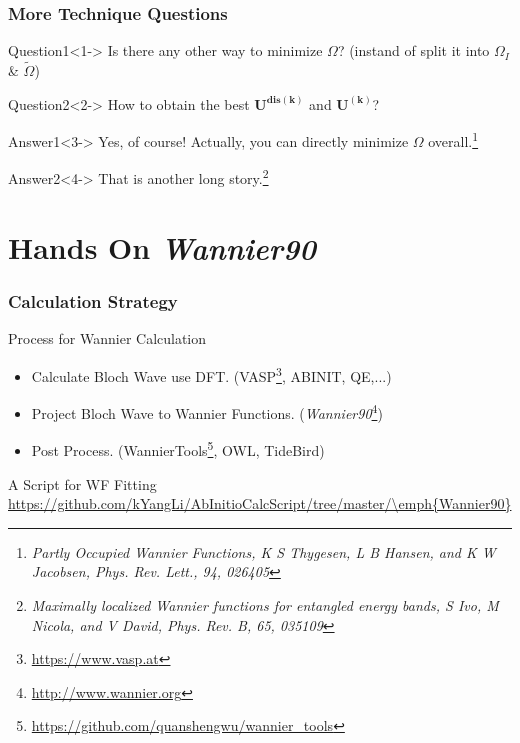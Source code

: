 \documentclass{beamer}
\begin{document}
  \begin{frame}
    \frametitle{More Technique Questions}
    \begin{alertblock}{Question1}<1->
      Is there any other way to minimize \(\Omega\)? (instand of split it into \(\Omega_I\) \& \(\widetilde{\Omega}\))
    \end{alertblock}


    \begin{alertblock}{Question2}<2->
      How to obtain the best \(\mathbf{U^{dis(\mathbf{k})}}\) and \(\mathbf{U^{(\mathbf{k})}}\)?
    \end{alertblock}

    \begin{block}{Answer1}<3->
      Yes, of course! Actually, you can directly minimize \(\Omega\) overall.\footnote{\tiny\emph{Partly Occupied Wannier Functions, K S Thygesen, L B Hansen, and K W Jacobsen, Phys. Rev. Lett., 94, 026405}}
    \end{block}

    \begin{block}{Answer2}<4->
      That is another long story.\footnote{\tiny\emph{Maximally localized Wannier functions for entangled energy bands, S Ivo, M Nicola, and V David, Phys. Rev. B, 65, 035109}}
    \end{block}

  \end{frame}

  \section{Hands On \emph{Wannier90}}
  
  \begin{frame}
    \frametitle{Calculation Strategy}
    \begin{block}{Process for Wannier Calculation}
      \begin{itemize}
        \item Calculate Bloch Wave use DFT. (VASP\footnote{\url{https://www.vasp.at}}, ABINIT, QE,...)
        \item Project Bloch Wave to Wannier Functions. (\emph{Wannier90}\footnote{\url{http://www.wannier.org}})
        \item Post Process. (WannierTools\footnote{\url{https://github.com/quanshengwu/wannier_tools}}, OWL, TideBird)
      \end{itemize}      
    \end{block}

    \begin{block}{A Script for WF Fitting}
      \url{https://github.com/kYangLi/AbInitioCalcScript/tree/master/\emph{Wannier90}}
    \end{block}

  \end{frame}
\end{document}

